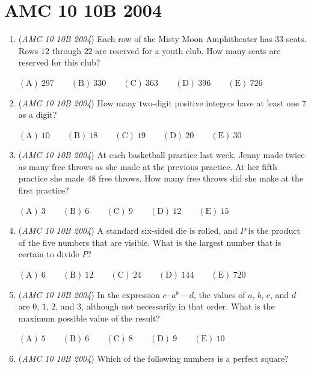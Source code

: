 \section{AMC 10 10B 2004}
        \begin{enumerate}
        	\item (\textit{AMC 10 10B 2004}) Each row of the Misty Moon Amphitheater has $33$ seats. Rows $12$ through $22$ are reserved for a youth club. How many seats are reserved for this club?


 $\mathrm{(A) \ } 297 \qquad \mathrm{(B) \ } 330\qquad \mathrm{(C) \ } 363\qquad \mathrm{(D) \ } 396\qquad \mathrm{(E) \ } 726$


	\item (\textit{AMC 10 10B 2004}) How many two-digit positive integers have at least one $7$ as a digit?


 $\mathrm{(A) \ } 10 \qquad \mathrm{(B) \ } 18\qquad \mathrm{(C) \ } 19 \qquad \mathrm{(D) \ } 20\qquad \mathrm{(E) \ } 30$


	\item (\textit{AMC 10 10B 2004}) At each basketball practice last week, Jenny made twice as many free throws as she made at the previous practice. At her fifth practice she made $48$ free throws. How many free throws did she make at the first practice?


 $\mathrm{(A) \ } 3 \qquad \mathrm{(B) \ } 6 \qquad \mathrm{(C) \ } 9 \qquad \mathrm{(D) \ } 12\qquad \mathrm{(E) \ } 15$


	\item (\textit{AMC 10 10B 2004}) A standard six-sided die is rolled, and $P$ is the product of the five numbers that are visible. What is the largest number that is certain to divide $P$?


 $\mathrm{(A) \ } 6 \qquad \mathrm{(B) \ } 12 \qquad \mathrm{(C) \ } 24 \qquad \mathrm{(D) \ } 144\qquad \mathrm{(E) \ } 720$


	\item (\textit{AMC 10 10B 2004}) In the expression $c\cdot a^b-d$, the values of $a$, $b$, $c$, and $d$ are $0$, $1$, $2$, and $3$, although not necessarily in that order. What is the maximum possible value of the result?


 $\mathrm{(A) \ } 5 \qquad \mathrm{(B) \ } 6\qquad \mathrm{(C) \ } 8 \qquad \mathrm{(D) \ } 9\qquad \mathrm{(E) \ } 10$


	\item (\textit{AMC 10 10B 2004}) Which of the following numbers is a perfect square?



\end{enumerate}
